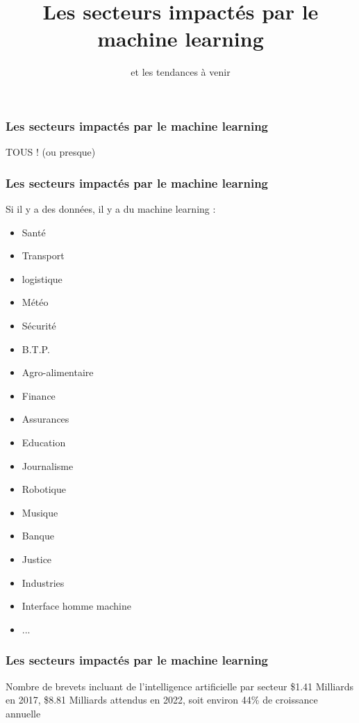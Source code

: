 \documentclass{formation}
\title{Les secteurs impactés par le machine learning}
\subtitle{et les tendances à venir}
\begin{document}
\maketitle

\begin{frame}
  \frametitle{Les secteurs impactés par le machine learning}
  \begin{center}
    \huge TOUS ! (ou presque)
  \end{center}
\end{frame}

\begin{frame}
  \frametitle{Les secteurs impactés par le machine learning}
  Si il y a des données, il y a du machine learning :
  \newline
  \newline
  \begin{minipage}[c]{0.49\linewidth}
    \begin{itemize}
    \item Santé 
    \item Transport
    \item logistique
    \item Météo
    \item Sécurité
    \item B.T.P.
    \item Agro-alimentaire    
    \item Finance
    \item Assurances
    \end{itemize}
  \end{minipage}\hfill
  \begin{minipage}[c]{0.49\linewidth}
    \begin{itemize}
    \item Education
    \item Journalisme
    \item Robotique
    \item Musique
    \item Banque
    \item Justice
    \item Industries
    \item Interface homme machine
    \item ...
    \end{itemize}
  \end{minipage}\hfill
\end{frame}

\begin{frame}
  \frametitle{Les secteurs impactés par le machine learning}
  Nombre de brevets incluant de l'intelligence artificielle par secteur
  \$1.41 Milliards en 2017, \$8.81 Milliards attendus en 2022, soit environ 44\% de croissance annuelle 
\end{frame}
\end{document}

